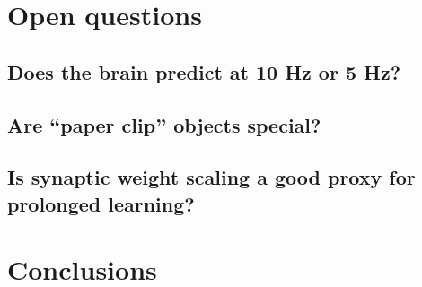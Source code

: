 \documentclass[dwyatte_dissertation.tex]{subfiles}
\begin{document}
\section{Open questions}

\subsection{Does the brain predict at 10 Hz or 5 Hz?}
%
%


\subsection{Are ``paper clip'' objects special?} %



\subsection{Is synaptic weight scaling a good proxy for prolonged learning?} 


\section{Conclusions}



\end{document}
